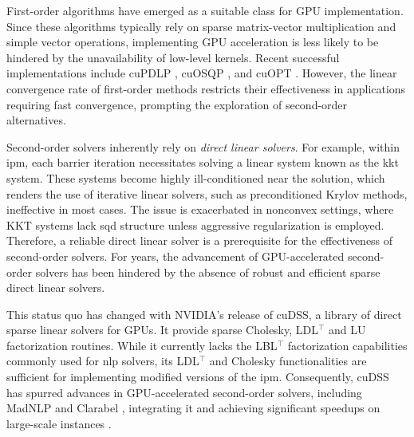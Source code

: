 \documentclass{article}
\begin{document}
First-order algorithms have emerged as a suitable class for GPU implementation. Since these algorithms typically rely on sparse matrix-vector multiplication and simple vector operations, implementing GPU acceleration is less likely to be hindered by the unavailability of low-level kernels. Recent successful implementations include cuPDLP \cite{luCuPDLPCStrengthenedImplementation2024,luCuPDLPFurtherEnhanced2025}, cuOSQP \cite{schubigerGPUAccelerationADMM2020}, and cuOPT \cite{NVIDIACuopt2025}. However, the linear convergence rate of first-order methods restricts their effectiveness in applications requiring fast convergence, prompting the exploration of second-order alternatives.

Second-order solvers inherently rely on \emph{direct linear solvers}. For example, within \gls*{ipm}, each barrier iteration necessitates solving a linear system known as the \gls*{kkt} system. These systems become highly ill-conditioned near the solution, which renders the use of iterative linear solvers, such as preconditioned Krylov methods, ineffective in most cases.
The issue is exacerbated in nonconvex settings, where KKT systems lack \gls*{sqd} structure unless aggressive regularization is employed.
Therefore, a reliable direct linear solver is a prerequisite for the effectiveness of second-order solvers. For years, the advancement of GPU-accelerated second-order solvers has been hindered by the absence of robust and efficient sparse direct linear solvers.

This status quo has changed with NVIDIA's release of cuDSS, a library of direct sparse linear solvers for GPUs.
It provide sparse Cholesky, LDL$^\top$ and LU factorization routines.
While it currently lacks the LBL$^\top$ factorization capabilities commonly used for \gls*{nlp} solvers, its LDL$^\top$ and Cholesky functionalities are sufficient for implementing modified versions of the \gls*{ipm}.
Consequently, cuDSS has spurred advances in GPU-accelerated second-order solvers, including MadNLP \cite{shinAcceleratingOptimalPower2024} and Clarabel \cite{goulartClarabelInteriorpointSolver2024}, integrating it and achieving significant speedups on large-scale instances \cite{shinNVIDIACuDSSLibrary2024,shinAcceleratingOptimalPower2024,pacaudCondensedspaceMethodsNonlinear2024,shinScalableMultiPeriodAC2024,pacaudGPUacceleratedDynamicNonlinear2024}.
\end{document}
